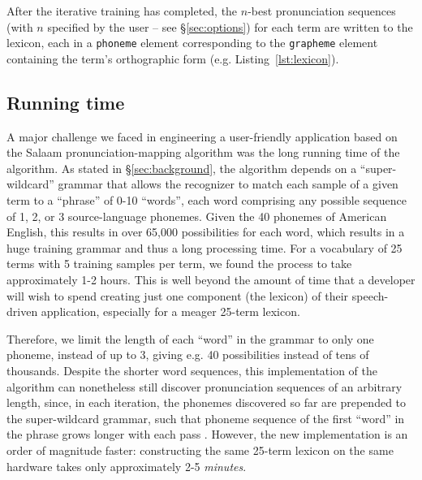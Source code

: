 \documentclass[11pt]{article}
\begin{document}

After the iterative training has completed, the $n$-best pronunciation sequences (with $n$ specified by the user -- see \S\ref{sec:options}) for each term are written to the lexicon, each in a \texttt{phoneme} element corresponding to the \texttt{grapheme} element containing the term's orthographic form (e.g. Listing~\ref{lst:lexicon}).

\subsection{Running time}
\label{sec:runningtime}

A major challenge we faced in engineering a user-friendly application based on the Salaam pronunciation-mapping algorithm \cite{Qiao10} was the long running time of the algorithm. As stated in \S\ref{sec:background}, the algorithm 
depends on a ``super-wildcard'' grammar that allows the recognizer to match each sample of a given term to a ``phrase'' of 0-10 ``words'', each word comprising any possible sequence of 1, 2, or 3 source-language phonemes. Given the 40 phonemes of American English, this results in over 65,000 possibilities for each word, which results in a huge training grammar and thus a long processing time. For a vocabulary of 25 terms with 5 training samples per term, we found the process to take approximately 1-2 hours. This is well beyond the amount of time that a developer will wish to spend creating just one component (the lexicon) of their speech-driven application, especially for a meager 25-term lexicon. 

Therefore, we limit the length of each ``word'' in the grammar to only one phoneme, instead of up to 3, giving e.g. 40 possibilities instead of tens of thousands. 
Despite the shorter word sequences, this implementation of the algorithm can nonetheless still discover pronunciation sequences of an arbitrary length, since, in each iteration, the phonemes discovered so far are prepended to the super-wildcard grammar, such that phoneme sequence of the first ``word'' in the phrase grows longer with each pass \cite[p.~4]{Qiao10}. 
However, the new implementation is an order of magnitude faster: constructing the same 25-term lexicon on the same hardware takes only approximately 2-5 \textit{minutes}. 
\end{document}
